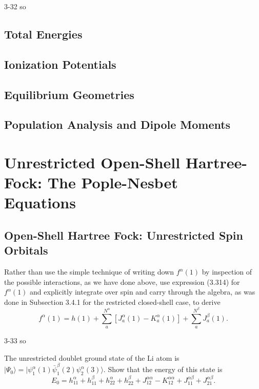 \documentclass[a4paper]{book}
\begin{document}
	\begin{solution}
		3-32 so
	\end{solution}
	
	\subsection{Total Energies}
	
	\subsection{Ionization Potentials}
	
	\subsection{Equilibrium Geometries}
	
	\subsection{Population Analysis and Dipole Moments}
	
	\section{Unrestricted Open-Shell Hartree-Fock: The Pople-Nesbet \texorpdfstring{\\}- Equations}
	
	\subsection{Open-Shell Hartree Fock: Unrestricted Spin Orbitals}
	
	\begin{exercise}
	Rather than use the simple technique of writing down $f^\alpha(1)$ by inspection of the possible interactions, as we have done above, use expression (3.314) for $f^\alpha(1)$  and explicitly integrate over spin and carry through the algebra, as was done in Subsection 3.4.1 for the restricted closed-shell case, to derive
	\[
		f^\alpha(1) = h(1) + \sum_a^{N^\alpha} \left[ J^\alpha_a(1) - K^\alpha_a(1) \right] + \sum_a^{N^\beta} J^\beta_a(1).
	\]
	\end{exercise}
	
	\begin{solution}
		3-33 so
	\end{solution}
	
	\begin{exercise}
	The unrestricted doublet ground state of the Li atom is $|\Psi_0 \rangle = | \psi^\alpha_1(1) \bar{\psi}^\beta_1(2) \psi_2^\alpha(3) \rangle$. Show that the energy of this state is
	\[
		E_0 = h^\alpha_{11} + h^\beta_{11} + h^\alpha_{22} + h^\beta_{22} + J^{\alpha\alpha}_{12} - K^{\alpha\alpha}_{12} + J^{\alpha\beta}_{11} + J^{\alpha\beta}_{21}.
	\] 
	\end{exercise}
	
\end{document}
